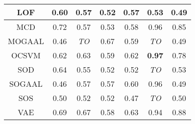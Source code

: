 \begin{table*}[!t]
\begin{tabular}{|c|c|c|c|c|c|c|}
\hline
                LOF &                0.60 &           0.57 &               0.52 &               0.57 &             0.53 &             0.49 \\
\hline
                MCD &                0.72 &           0.57 &               0.53 &               0.58 &             0.96 &             0.85 \\
\hline
        MOGAAL &                0.46 &    \textit{TO} &               0.67 &               0.59 &      \textit{TO} &             0.49 \\
\hline
                OCSVM &                0.62 &           0.63 &               0.59 &               0.62 &    \textbf{0.97} &             0.78 \\
\hline
                SOD &                0.64 &           0.55 &               0.52 &               0.52 &      \textit{TO} &             0.53 \\
\hline
        SOGAAL &                0.46 &           0.57 &               0.57 &               0.60 &             0.96 &             0.49 \\
\hline
                SOS &                0.50 &           0.52 &               0.52 &               0.47 &      \textit{TO} &             0.50 \\
\hline
                VAE &                0.69 &           0.67 &               0.58 &               0.63 &             0.94 &             0.88 \\
\hline
\end{tabular}
\end{table*}


